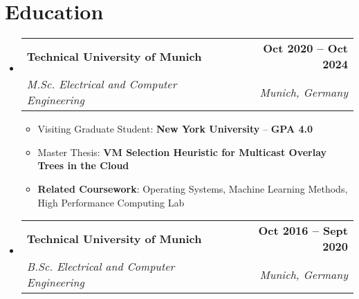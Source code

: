 \documentclass[letterpaper,11pt]{article}
\makeatletter
\newcommand{\resumeItem}[1]{
  \item\small{
    {#1 \vspace{-2pt}}
  }
}
\newcommand{\resumeSubheading}[4]{
  \vspace{-2pt}\item
    \begin{tabular*}{1.0\textwidth}[t]{l@{\extracolsep{\fill}}r}
      \textbf{#1} & \textbf{\small #2} \\
      \textit{\small#3} & \textit{\small #4} \\
    \end{tabular*}\vspace{-7pt}
}
\newcommand{\resumeSubHeadingListStart}{\begin{itemize}[leftmargin=0.0in, label={}]}
\newcommand{\resumeSubHeadingListEnd}{\end{itemize}}
\newcommand{\resumeItemListStart}{\begin{itemize}}
\newcommand{\resumeItemListEnd}{\end{itemize}\vspace{-5pt}}
\makeatother
\begin{document}
\section{Education}
  \resumeSubHeadingListStart
    \resumeSubheading
        {Technical University of Munich}{Oct 2020 -- Oct 2024}
        {M.Sc. Electrical and Computer Engineering}{Munich, Germany}
        \resumeItemListStart
            \resumeItem{Visiting Graduate Student: \textbf{New York University} -- \textbf{GPA 4.0}}
            \resumeItem{Master Thesis: \textbf{VM Selection Heuristic for Multicast Overlay Trees in the Cloud}}
            \resumeItem{\textbf{Related Coursework}: Operating Systems, Machine Learning Methods, High Performance Computing Lab}
        \resumeItemListEnd

    \vspace{1.0pt}
    \resumeSubheading
        {Technical University of Munich}{Oct 2016 -- Sept 2020}
        {B.Sc. Electrical and Computer Engineering}{Munich, Germany}
  \resumeSubHeadingListEnd

\end{document}
